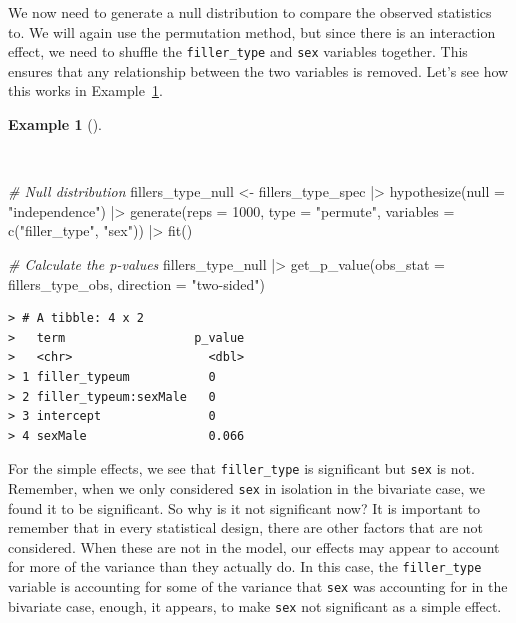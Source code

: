 \documentclass[
  letterpaper,
]{latex/krantz}
\newenvironment{Shaded}{\begin{snugshade}}{\end{snugshade}}
\newcommand{\AttributeTok}[1]{\textcolor[rgb]{0.00,0.00,0.00}{#1}}
\newcommand{\CommentTok}[1]{\textcolor[rgb]{0.00,0.00,0.00}{\textit{#1}}}
\newcommand{\DecValTok}[1]{\textcolor[rgb]{0.00,0.00,0.00}{#1}}
\newcommand{\FunctionTok}[1]{\textcolor[rgb]{0.00,0.00,0.00}{#1}}
\newcommand{\NormalTok}[1]{\textcolor[rgb]{0.00,0.00,0.00}{#1}}
\newcommand{\OtherTok}[1]{\textcolor[rgb]{0.00,0.00,0.00}{#1}}
\newcommand{\SpecialCharTok}[1]{\textcolor[rgb]{0.00,0.00,0.00}{#1}}
\newcommand{\StringTok}[1]{\textcolor[rgb]{0.00,0.00,0.00}{#1}}
\theoremstyle{definition}
\newtheorem{example}{Example}[chapter]
\theoremstyle{remark}
\begin{document}
We now need to generate a null distribution to compare the observed
statistics to. We will again use the permutation method, but since there
is an interaction effect, we need to shuffle the \texttt{filler\_type}
and \texttt{sex} variables together. This ensures that any relationship
between the two variables is removed. Let's see how this works in
Example~\ref{exm-ida-num-multi-null}.

\begin{example}[]\protect\hypertarget{exm-ida-num-multi-null}{}\label{exm-ida-num-multi-null}

~

\begin{Shaded}
\begin{Highlighting}[]
\CommentTok{\# Null distribution}
\NormalTok{fillers\_type\_null }\OtherTok{\textless{}{-}}
\NormalTok{  fillers\_type\_spec }\SpecialCharTok{|\textgreater{}}
  \FunctionTok{hypothesize}\NormalTok{(}\AttributeTok{null =} \StringTok{"independence"}\NormalTok{) }\SpecialCharTok{|\textgreater{}}
  \FunctionTok{generate}\NormalTok{(}\AttributeTok{reps =} \DecValTok{1000}\NormalTok{, }\AttributeTok{type =} \StringTok{"permute"}\NormalTok{, }\AttributeTok{variables =} \FunctionTok{c}\NormalTok{(}\StringTok{"filler\_type"}\NormalTok{, }\StringTok{"sex"}\NormalTok{)) }\SpecialCharTok{|\textgreater{}}
  \FunctionTok{fit}\NormalTok{()}

\CommentTok{\# Calculate the p{-}values}
\NormalTok{fillers\_type\_null }\SpecialCharTok{|\textgreater{}}
  \FunctionTok{get\_p\_value}\NormalTok{(}\AttributeTok{obs\_stat =}\NormalTok{ fillers\_type\_obs, }\AttributeTok{direction =} \StringTok{"two{-}sided"}\NormalTok{)}
\end{Highlighting}
\end{Shaded}

\begin{verbatim}
> # A tibble: 4 x 2
>   term                  p_value
>   <chr>                   <dbl>
> 1 filler_typeum           0    
> 2 filler_typeum:sexMale   0    
> 3 intercept               0    
> 4 sexMale                 0.066
\end{verbatim}

\end{example}

For the simple effects, we see that \texttt{filler\_type} is significant
but \texttt{sex} is not. Remember, when we only considered \texttt{sex}
in isolation in the bivariate case, we found it to be significant. So
why is it not significant now? It is important to remember that in every
statistical design, there are other factors that are not considered.
When these are not in the model, our effects may appear to account for
more of the variance than they actually do. In this case, the
\texttt{filler\_type} variable is accounting for some of the variance
that \texttt{sex} was accounting for in the bivariate case, enough, it
appears, to make \texttt{sex} not significant as a simple effect.
\end{document}
